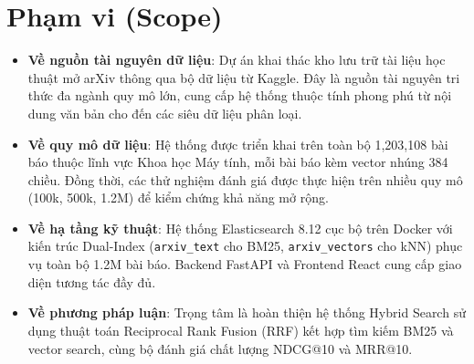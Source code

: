 \section{Phạm vi (Scope)}
\begin{itemize}
    \item \textbf{Về nguồn tài nguyên dữ liệu}: Dự án khai thác kho lưu trữ tài liệu học thuật mở arXiv thông qua bộ dữ liệu từ Kaggle. Đây là nguồn tài nguyên tri thức đa ngành quy mô lớn, cung cấp hệ thống thuộc tính phong phú từ nội dung văn bản cho đến các siêu dữ liệu phân loại.
    \item \textbf{Về quy mô dữ liệu}: Hệ thống được triển khai trên toàn bộ 1,203,108 bài báo thuộc lĩnh vực Khoa học Máy tính, mỗi bài báo kèm vector nhúng 384 chiều. Đồng thời, các thử nghiệm đánh giá được thực hiện trên nhiều quy mô (100k, 500k, 1.2M) để kiểm chứng khả năng mở rộng.
    \item \textbf{Về hạ tầng kỹ thuật}: Hệ thống Elasticsearch 8.12 cục bộ trên Docker với kiến trúc Dual-Index (\texttt{arxiv\_text} cho BM25, \texttt{arxiv\_vectors} cho kNN) phục vụ toàn bộ 1.2M bài báo. Backend FastAPI và Frontend React cung cấp giao diện tương tác đầy đủ.
    \item \textbf{Về phương pháp luận}: Trọng tâm là hoàn thiện hệ thống Hybrid Search sử dụng thuật toán Reciprocal Rank Fusion (RRF) kết hợp tìm kiếm BM25 và vector search, cùng bộ đánh giá chất lượng NDCG@10 và MRR@10.
\end{itemize}